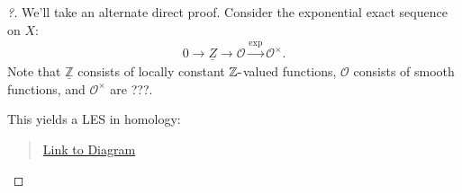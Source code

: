 \begin{proof}[?]

We'll take an alternate direct proof. Consider the exponential exact
sequence on \(X\):
\begin{align*}
0 \to \underline{Z} \to {\mathcal{O}}\xrightarrow{\exp} {\mathcal{O}}^{\times}
.\end{align*}
Note that \(\underline{{\mathbb{Z}}}\) consists of locally constant
\({\mathbb{Z}}{\hbox{-}}\)valued functions, \({\mathcal{O}}\) consists
of smooth functions, and \({\mathcal{O}}^{\times}\) are ???.


This yields a LES in homology:

\begin{center}
\end{center}

\begin{quote}
\href{https://q.uiver.app/?q=WzAsOSxbMCwwLCJIXjAoWDsgXFxjb25zdGFudHtcXFpafSkiXSxbMCwyLCJIXjEoWDsgXFxjb25zdGFudHtcXFpafSkiXSxbMCw0LCJIXjIoWDsgXFxjb25zdGFudHtcXFpafSkiXSxbMiwwLCJIXjAoWDsgXFxPTykiXSxbMiwyLCJIXjEoWDsgXFxPTykiLFswLDYwLDYwLDFdXSxbMiw0LCJIXjIoWDsgXFxPTykiLFswLDYwLDYwLDFdXSxbNCwwLCJIXjAoWDsgXFxPT1xcdW5pdHMpIl0sWzQsMiwiSF4xKFg7IFxcT09cXHVuaXRzKSJdLFs0LDQsIkheMihYOyBcXE9PXFx1bml0cykiXSxbMCwzXSxbMyw2XSxbNiwxXSxbMSw0XSxbNCw3XSxbNywyXSxbMiw1XSxbNSw4XV0=}{Link
to Diagram}
\end{quote}


\end{proof}

